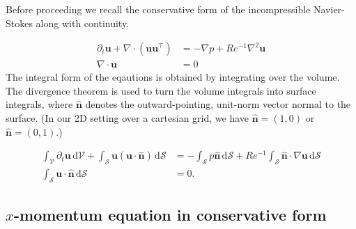 \documentclass[english]{article}
\begin{document}
\noindent Before proceeding we recall the conservative form of the incompressible Navier-Stokes along with continuity.

\begin{align}
\partial_t \mathbf{u} + \nabla \cdot \left(\mathbf{u}\mathbf{u}^\top \right) &=  - \nabla p + Re^{-1}\nabla^2 \mathbf{u} \\
\nabla \cdot \mathbf{u} &= 0
\end{align}
\noindent The integral form of the eqautions is obtained by integrating over the volume. The divergence theorem is used to turn the volume integrals into surface integrals, where $\mathbf{\hat{n}}$ denotes the outward-pointing, unit-norm vector normal to the surface. (In our 2D setting over a cartesian grid, we have $\mathbf{\hat{n}} = (1,0)$ or $\mathbf{\hat{n}} = (0,1)$.)

\begin{align}
  \label{eq:ns_equation}
  \int _{\mathcal{V}} \partial_t \mathbf{u}\, \mathrm{d}\mathcal{V} + \int_{\mathcal{S}} \mathbf{u}\left(\mathbf{u}\cdot \mathbf{\hat{n}}\right)\,\mathrm{d}\mathcal{S} &=  - \int _{\mathcal{S}} p\mathbf{\hat{n}}\, \mathrm{d}\mathcal{S} + Re^{-1}\int_{\mathcal{S}} \mathbf{\hat{n}} \cdot \nabla \mathbf{u} \,\mathrm{d}\mathcal{S} \\
  \label{eq:cont_equation}
\int_{\mathcal{S}} \mathbf{u} \cdot \mathbf{\hat{n}}\,\mathrm{d}\mathcal{S} &= 0.
\end{align}


\subsection{$x$-momentum equation in conservative form}
\end{document}
